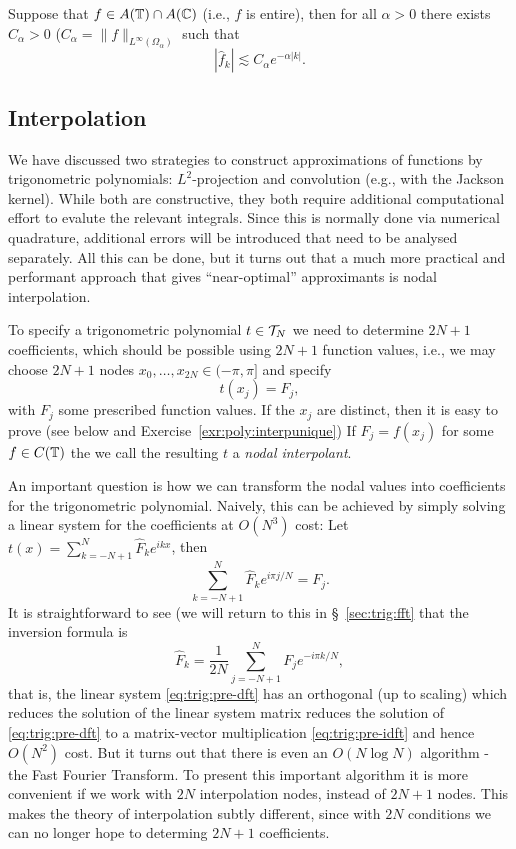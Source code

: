 \begin{corollary} \label{th:trig:pw-entire}
  Suppose that $f \in A(\mathbb{T}) \cap A(\mathbb{C})$  (i.e., $f$ is entire), then for all
  $\alpha > 0$ there exists $C_\alpha > 0$ ($C_\alpha =
  \|f\|_{L^\infty(\Omega_\alpha)}$ such that
  \[
      |\hat{f}_k| \lesssim C_\alpha e^{-\alpha |k|}.
  \]
\end{corollary}



\subsection{Interpolation}
%
\label{sec:trig:interp}
%
We have discussed two strategies to construct approximations of functions by
trigonometric polynomials: $L^2$-projection and convolution (e.g., with the
Jackson kernel). While both are constructive, they both require additional
computational effort to evalute the relevant integrals. Since this is normally
done via numerical quadrature, additional errors will be introduced that
need to be analysed separately. All this can be done, but it turns out that
a much more practical and performant approach that gives ``near-optimal''
approximants is nodal interpolation.

To specify a trigonometric polynomial $t \in \mathcal{T}_N$ we need to determine
$2N+1$ coefficients, which should be possible using $2N+1$ function values,
i.e., we may choose $2N+1$ nodes $x_0, \dots, x_{2N} \in (-\pi, \pi]$
and specify
\[
    t(x_j) = F_j,
\]
with $F_j$ some prescribed function values. If the $x_j$ are distinct, then it
is easy to prove (see below and Exercise~\ref{exr:poly:interpunique}) If $F_j =
f(x_j)$ for some $f \in C(\mathbb{T})$ the we call the resulting $t$ a {\em nodal
interpolant}.

An important question is how we can transform the nodal values into coefficients
for the trigonometric polynomial. Naively, this can be achieved by simply
solving a linear system for the coefficients at $O(N^3)$ cost:
Let $t(x) = \sum_{k = -N+1}^N \hat{F}_k e^{ik x}$, then
\begin{equation} \label{eq:trig:pre-dft}
  \sum_{k = -N+1}^N \hat{F}_k e^{i\pi j/N} = F_j.
\end{equation}
It is straightforward to see (we will return to this in \S~\ref{sec:trig:fft}
that the inversion formula is
\begin{equation} \label{eq:trig:pre-idft}
    \hat{F}_k = \frac{1}{2N} \sum_{j = -N+1}^N F_j e^{-i\pi k/N},
\end{equation}
that is, the linear system \eqref{eq:trig:pre-dft}  has an orthogonal (up to
scaling) which reduces the solution of the linear system matrix reduces the
solution of \eqref{eq:trig:pre-dft} to a matrix-vector multiplication
\eqref{eq:trig:pre-idft} and hence $O(N^2)$ cost. But it turns out that there is
even an $O(N \log N)$ algorithm - the Fast Fourier Transform. To present this
important algorithm it is more convenient if we work with $2N$ interpolation
nodes, instead of $2N+1$ nodes. This makes the theory of interpolation subtly
different, since with $2N$ conditions we can no longer hope to determing $2N+1$
coefficients.

